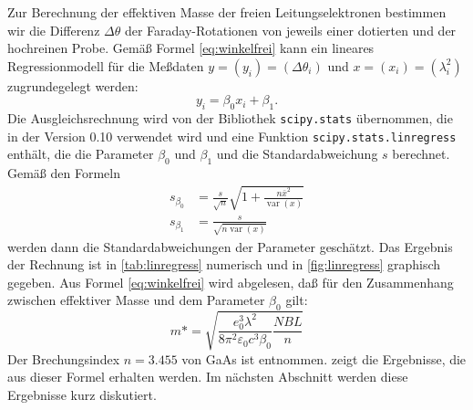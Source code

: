 Zur Berechnung der effektiven Masse der freien Leitungselektronen
bestimmen wir die Differenz $\Delta\theta$ der Faraday-Rotationen von
jeweils einer dotierten und der hochreinen Probe.  Gemäß Formel
\eqref{eq:winkelfrei} kann ein lineares Regressionmodell für die
Meßdaten $y = (y_i) = (\Delta\theta_i)$ und $x = (x_i) = (\lambda_i^2)$
zugrundegelegt werden:
%
\begin{equation}
  \label{eq:linregress}
  y_i = \beta_0 x_i + \beta_1.
\end{equation}
Die Ausgleichsrechnung wird von der Bibliothek \texttt{scipy.stats}
übernommen, die in der Version 0.10 verwendet wird und eine Funktion
\texttt{scipy.stats.linregress} enthält, die die Parameter $\beta_0$ und
$\beta_1$ und die Standardabweichung $s$ berechnet.  Gemäß den Formeln
%
\begin{align}
  \label{eq:stat-formeln}
  s_{\beta_0} &= \frac{s}{\sqrt{n}} \sqrt{1 + \frac{n\bar{x}^2}
    {\operatorname{var}(x)}}\\
  s_{\beta_1} &= \frac{s}{\sqrt{n \operatorname{var}(x)}}
\end{align}
%
werden dann die Standardabweichungen der Parameter geschätzt.  Das
Ergebnis der Rechnung ist in \cref{tab:linregress} numerisch und in
\cref{fig:linregress} graphisch gegeben.  Aus Formel
\eqref{eq:winkelfrei} wird abgelesen, daß für den Zusammenhang zwischen
effektiver Masse und dem Parameter $\beta_0$ gilt:
%
\begin{equation}
m* = \sqrt{\frac{e_0^3\lambda^2}{8\pi^2\varepsilon_0c^3\beta_0} \frac{NBL}{n}}
\end{equation}
%
Der Brechungsindex $n = \num{3.455}$ von GaAs ist \cite{filmetrics}
entnommen.  zeigt die Ergebnisse, die aus dieser
Formel erhalten werden.  Im nächsten Abschnitt werden diese Ergebnisse
kurz diskutiert.

